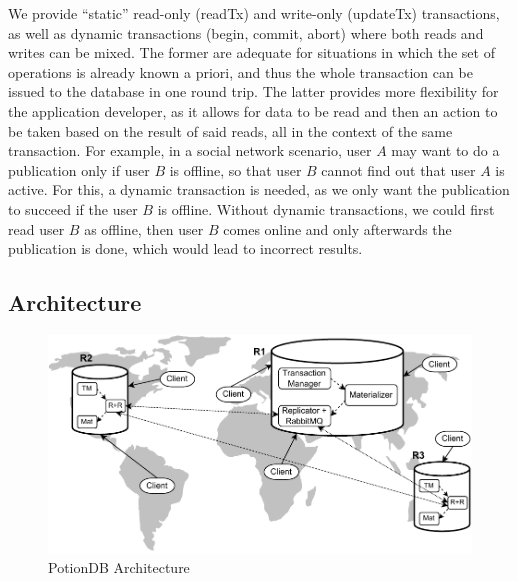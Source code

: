 \documentclass{vldb}
\newcommand{\code}[1]{\textsf{\small{#1}}}
\newcommand{\carla}[1]{\nbnote{Carla}{green}{#1}}
\begin{document}
We provide ``static'' read-only (\code{readTx}) and write-only (\code{updateTx}) transactions, 
as well as dynamic transactions (\code{begin}, \code{commit}, \code{abort}) where both reads and writes can be mixed.
The former are adequate for situations in which the set of operations is already known a priori, and thus the whole transaction can be issued to the database in one round trip.
The latter provides more flexibility for the application developer, as it allows for data to be read and then an action to be taken based on the result of said reads, all in the context of the same transaction.
For example, in a social network scenario, user $A$ may want to do a publication only if user $B$ is offline, so that user $B$ cannot find out that user $A$ is active.
For this, a dynamic transaction is needed, as we only want the publication to succeed if the user $B$ is offline.
Without dynamic transactions, we could first read user $B$ as offline, then user $B$ comes online and only afterwards the publication is done, which would lead to incorrect results.

\subsection{Architecture}
\label{subsec:architecture}


\begin{figure}
	\centering
	\includegraphics[width=\linewidth]{PotionDBArch}
	\caption{PotionDB Architecture}
	\label{fig:arch}
\end{figure}
\end{document}
